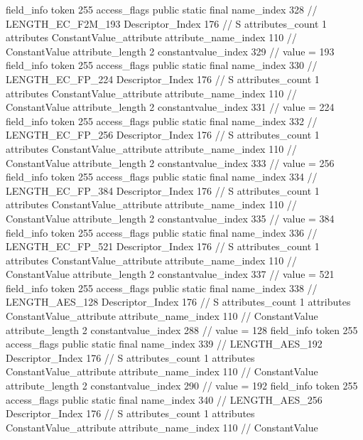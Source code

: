 {{{{			field_info {
				token	255
				access_flags	public static final
				name_index	328		// LENGTH_EC_F2M_193
				Descriptor_Index	176		// S
				attributes_count	1
				attributes {
				ConstantValue_attribute {
					attribute_name_index	110		// ConstantValue
					attribute_length	2
					constantvalue_index	329		// value = 193
				}
				}
			}
			field_info {
				token	255
				access_flags	public static final
				name_index	330		// LENGTH_EC_FP_224
				Descriptor_Index	176		// S
				attributes_count	1
				attributes {
				ConstantValue_attribute {
					attribute_name_index	110		// ConstantValue
					attribute_length	2
					constantvalue_index	331		// value = 224
				}
				}
			}
			field_info {
				token	255
				access_flags	public static final
				name_index	332		// LENGTH_EC_FP_256
				Descriptor_Index	176		// S
				attributes_count	1
				attributes {
				ConstantValue_attribute {
					attribute_name_index	110		// ConstantValue
					attribute_length	2
					constantvalue_index	333		// value = 256
				}
				}
			}
			field_info {
				token	255
				access_flags	public static final
				name_index	334		// LENGTH_EC_FP_384
				Descriptor_Index	176		// S
				attributes_count	1
				attributes {
				ConstantValue_attribute {
					attribute_name_index	110		// ConstantValue
					attribute_length	2
					constantvalue_index	335		// value = 384
				}
				}
			}
			field_info {
				token	255
				access_flags	public static final
				name_index	336		// LENGTH_EC_FP_521
				Descriptor_Index	176		// S
				attributes_count	1
				attributes {
				ConstantValue_attribute {
					attribute_name_index	110		// ConstantValue
					attribute_length	2
					constantvalue_index	337		// value = 521
				}
				}
			}
			field_info {
				token	255
				access_flags	public static final
				name_index	338		// LENGTH_AES_128
				Descriptor_Index	176		// S
				attributes_count	1
				attributes {
				ConstantValue_attribute {
					attribute_name_index	110		// ConstantValue
					attribute_length	2
					constantvalue_index	288		// value = 128
				}
				}
			}
			field_info {
				token	255
				access_flags	public static final
				name_index	339		// LENGTH_AES_192
				Descriptor_Index	176		// S
				attributes_count	1
				attributes {
				ConstantValue_attribute {
					attribute_name_index	110		// ConstantValue
					attribute_length	2
					constantvalue_index	290		// value = 192
				}
				}
			}
			field_info {
				token	255
				access_flags	public static final
				name_index	340		// LENGTH_AES_256
				Descriptor_Index	176		// S
				attributes_count	1
				attributes {
				ConstantValue_attribute {
					attribute_name_index	110		// ConstantValue
}}}}}}}
